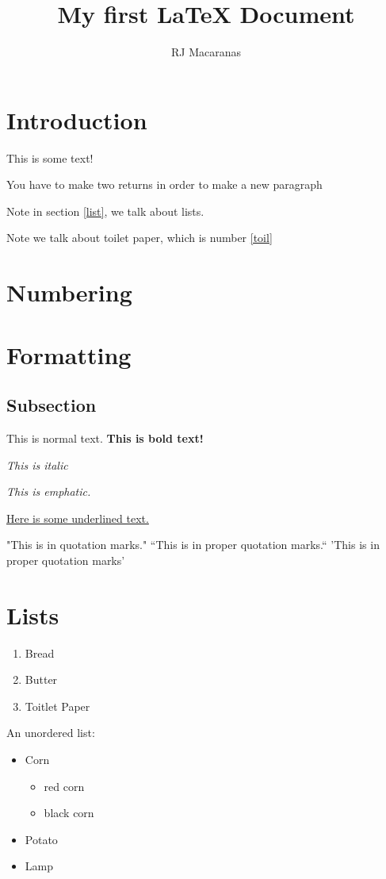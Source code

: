 \documentclass{article} %
\author{RJ Macaranas}
\title{My first {\LaTeX} Document}
\begin{document}
\maketitle
\section{Introduction}
This is some text!


You have to make two returns in order to make a new paragraph

Note in section \ref{list}, we talk about lists.

Note we talk about toilet paper, which is number \ref{toil}

\section{Numbering}

\section{Formatting}

\subsection{Subsection}

This is normal text. \textbf{This is bold text!}

\textit{This is italic}

\emph{This is emphatic.}

\underline{Here is some underlined text.}

"This is in quotation marks."
``This is in proper quotation marks.``
'This is in proper quotation marks'

\section{Lists\label{list}}

\begin{enumerate}
\item Bread
\item Butter
\item Toitlet Paper\label{toil}
\end{enumerate}
An unordered list:

\begin{itemize}
\item Corn
\begin{itemize}
\item red corn
\item black corn
\end{itemize}
\item Potato
\item Lamp
\end{itemize}
\end{document}
